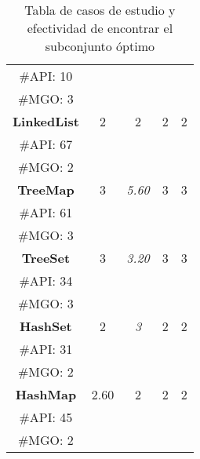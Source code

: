 \begin{table}[H]
\begin{tabular}{c ccccc}
\multicolumn{2}{c}{\tiny \#API: 10} &  &   & &    \\
\multicolumn{2}{c}{\tiny \#MGO: 3} &  &   & &    \\
\midrule\multicolumn{2}{c}{\textbf{LinkedList}} & 2 &  2 &  2 &  2  \\
\multicolumn{2}{c}{\tiny \#API: 67} &  &   & &   \\
\multicolumn{2}{c}{\tiny \#MGO: 2} &  &   & &    \\
\midrule
\multicolumn{2}{c}{\textbf{TreeMap}} &  3 & \cellcolor{gray!25}\emph{5.60}  &  3  &  3   \\
\multicolumn{2}{c}{\tiny \#API: 61} &  &   & &  \\
\multicolumn{2}{c}{\tiny \#MGO: 3} &  &   & &  \\
\midrule
\multicolumn{2}{c}{\textbf{TreeSet}} &  3&\cellcolor{gray!25} \emph{3.20}  &  3 &  3  \\
\multicolumn{2}{c}{\tiny \#API: 34} &  &   & &  \\
\multicolumn{2}{c}{\tiny \#MGO: 3} &  &   & &   \\
\midrule
\multicolumn{2}{c}{\textbf{HashSet}} &  2 &\cellcolor{gray!25} \emph{3}  &  2 &  2 \\
\multicolumn{2}{c}{\tiny \#API: 31} &  &   & &  \\
\multicolumn{2}{c}{\tiny \#MGO: 2} &  &   & &    \\
\midrule
\multicolumn{2}{c}{\textbf{HashMap}} & \cellcolor{gray!25}2.60  & 2  &2   &2     \\
\multicolumn{2}{c}{\tiny \#API: 45} &  &   & &    \\
\multicolumn{2}{c}{\tiny \#MGO: 2} &  &   & &   \\
\hline
\end{tabular}

\caption{Tabla de casos de estudio y efectividad de encontrar el subconjunto óptimo}
\label{tab:efectividad}
\end{table}

